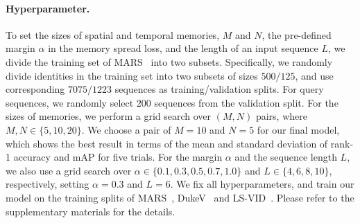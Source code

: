 \documentclass[10pt,twocolumn,letterpaper]{article}
\begin{document}
		
		\vspace{-0.4cm}		
		\paragraph{Hyperparameter.}
		
			To set the sizes of spatial and temporal memories, $M$ and $N$, the pre-defined margin $\alpha$ in the memory spread loss, and the length of an input sequence $L$, we divide the training set of MARS~\cite{zheng2016mars} into two subsets. Specifically, we randomly divide identities in the training set into two subsets of sizes $500/125$, and use corresponding $7075/1223$ sequences as training/validation splits. For query sequences, we randomly select $200$ sequences from the validation split. For the sizes of memories, we perform a grid search over $(M,N)$ pairs, where $M,N \in \{5, 10, 20 \}$. We choose a pair of $M=10$ and $N=5$ for our final model, which shows the best result in terms of the mean and standard deviation of rank-1 accuracy and mAP for five trials. For the margin $\alpha$ and the sequence length $L$, we also use a grid search over $\alpha \in \{ 0.1, 0.3, 0.5, 0.7, 1.0\}$ and $L \in \{ 4, 6, 8, 10\}$, respectively, setting $\alpha = 0.3$ and $L = 6$. We fix all hyperparameters, and train our model on the training splits of MARS~\cite{zheng2016mars}, DukeV~\cite{wu2018exploit} and LS-VID~\cite{li2019global}. Please refer to the supplementary materials for the details.
		
\end{document}
